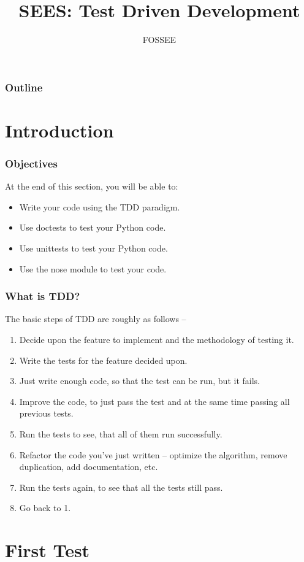 \documentclass[12pt,presentation]{beamer}
\title{SEES: Test Driven Development}
\author{FOSSEE}
\begin{document}
\maketitle

\begin{frame}
\frametitle{Outline}
\setcounter{tocdepth}{3}
\tableofcontents
\end{frame}

\section{Introduction}

\begin{frame}
  \frametitle{Objectives}
  At the end of this section, you will be able to:
  \begin{itemize}
  \item Write your code using the TDD paradigm.
  \item Use doctests to test your Python code.
  \item Use unittests to test your Python code.
  \item Use the nose module to test your code.
  \end{itemize}
\end{frame}

\begin{frame}
  \frametitle{What is TDD?}
  The basic steps of TDD are roughly as follows --
  \begin{enumerate}
  \item Decide upon the feature to implement and the methodology of
    testing it.
  \item Write the tests for the feature decided upon.
  \item Just write enough code, so that the test can be run, but it fails.
  \item Improve the code, to just pass the test and at the same time
    passing all previous tests.
  \item Run the tests to see, that all of them run successfully.
  \item Refactor the code you've just written -- optimize the algorithm,
    remove duplication, add documentation, etc.
  \item Run the tests again, to see that all the tests still pass.
  \item Go back to 1.
  \end{enumerate}
\end{frame}

\section{First Test}
\end{document}
